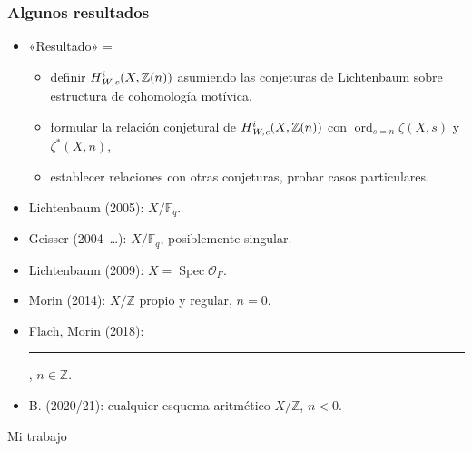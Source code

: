 \documentclass[handout]{beamer}
\newcommand{\FF}{\mathbb{F}}
\newcommand{\ZZ}{\mathbb{Z}}
\DeclareMathOperator{\ord}{ord}
\DeclareMathOperator{\Spec}{Spec}
\newcommand{\Wc}{\text{\it W,c}}
\begin{document}
\begin{frame}
  \frametitle{Algunos resultados}

  \begin{itemize}
  \item «Resultado» =
    \begin{itemize}
    \item definir $H^i_\Wc (X, \ZZ(n))$ asumiendo las conjeturas de Lichtenbaum
      sobre estructura de cohomología motívica,
    \item formular la relación conjetural de $H^i_\Wc (X, \ZZ(n))$ con
      $\ord_{s=n} \zeta (X,s)$ y $\zeta^* (X,n)$,
    \item establecer relaciones con otras conjeturas, probar casos particulares.
    \end{itemize}

  \item Lichtenbaum (2005): $X/\FF_q$.

  \item Geisser (2004--\dots): $X/\FF_q$, posiblemente singular.

  \item Lichtenbaum (2009): $X = \Spec \mathcal{O}_F$.

  \item Morin (2014): $X/\ZZ$ propio y regular, $n = 0$.

  \item Flach, Morin (2018): \rule[0.25em]{2.3cm}{0.6pt}, $n \in \ZZ$.

  \item B. (2020/21): cualquier esquema aritmético $X/\ZZ$, $n < 0$.
  \end{itemize}
\end{frame}


\begin{frame}[plain]
  \headingfont

  \begin{center}
    {\huge Mi trabajo}
  \end{center}
\end{frame}

\end{document}
